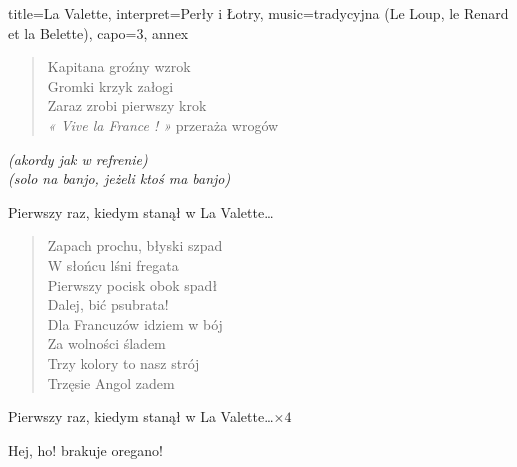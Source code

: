 \begin{song}{title={La Valette}, interpret={Perły i Łotry}, music={tradycyjna (Le Loup, le Renard et la Belette)}, capo=3, annex}
\begin{multicols}{2}
\begin{verse}
        Kapitana groźny wzrok \\
        Gromki krzyk załogi \\
        Zaraz zrobi pierwszy krok \\
        \textit{« Vive la France ! »} przeraża wrogów
    \end{verse}
    \begin{interlude}
        \textit{(akordy jak w refrenie)} \\
        \textit{(solo na banjo, jeżeli ktoś ma banjo)}
    \end{interlude}
    \begin{chorus}
        Pierwszy raz, kiedym stanął w La Valette\ldots
    \end{chorus}
    \begin{verse}
        Zapach prochu, błyski szpad \\
        W słońcu lśni fregata \\
        Pierwszy pocisk obok spadł \\
        Dalej, bić psubrata! \smallskip \\
        Dla Francuzów idziem w bój \\
        Za wolności śladem \\
        Trzy kolory to nasz strój \\
        Trzęsie Angol zadem
    \end{verse}
    \begin{chorus}
        Pierwszy raz, kiedym stanął w La Valette\ldots $\times 4$
    \end{chorus}
    \begin{outro}
        Hej, ho! brakuje oregano! \\
          
    \end{outro}
    \vfill\null
    \end{multicols}
\end{song}


